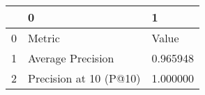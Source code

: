 \begin{tabular}{lll}
\toprule
 & 0 & 1 \\
\midrule
0 & Metric & Value \\
1 & Average Precision & 0.965948 \\
2 & Precision at 10 (P@10) & 1.000000 \\
\bottomrule
\end{tabular}
